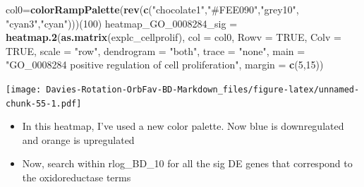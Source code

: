 \documentclass[
]{article}
\newenvironment{Shaded}{\begin{snugshade}}{\end{snugshade}}
\newcommand{\DataTypeTok}[1]{\textcolor[rgb]{0.13,0.29,0.53}{#1}}
\newcommand{\DecValTok}[1]{\textcolor[rgb]{0.00,0.00,0.81}{#1}}
\newcommand{\KeywordTok}[1]{\textcolor[rgb]{0.13,0.29,0.53}{\textbf{#1}}}
\newcommand{\NormalTok}[1]{#1}
\newcommand{\OtherTok}[1]{\textcolor[rgb]{0.56,0.35,0.01}{#1}}
\newcommand{\StringTok}[1]{\textcolor[rgb]{0.31,0.60,0.02}{#1}}
\begin{document}
\begin{Shaded}
\begin{Highlighting}[]
\NormalTok{col0=}\KeywordTok{colorRampPalette}\NormalTok{(}\KeywordTok{rev}\NormalTok{(}\KeywordTok{c}\NormalTok{(}\StringTok{"chocolate1"}\NormalTok{,}\StringTok{"#FEE090"}\NormalTok{,}\StringTok{"grey10"}\NormalTok{, }\StringTok{"cyan3"}\NormalTok{,}\StringTok{"cyan"}\NormalTok{)))(}\DecValTok{100}\NormalTok{)}
\NormalTok{heatmap_GO_}\DecValTok{0008284}\NormalTok{_sig =}\StringTok{ }\KeywordTok{heatmap.2}\NormalTok{(}\KeywordTok{as.matrix}\NormalTok{(explc_cellprolif), }\DataTypeTok{col =}\NormalTok{ col0, }\DataTypeTok{Rowv =} \OtherTok{TRUE}\NormalTok{, }\DataTypeTok{Colv =} \OtherTok{TRUE}\NormalTok{, }\DataTypeTok{scale =} \StringTok{"row"}\NormalTok{,}
                               \DataTypeTok{dendrogram =} \StringTok{"both"}\NormalTok{,}
                               \DataTypeTok{trace =} \StringTok{"none"}\NormalTok{,}
                               \DataTypeTok{main =} \StringTok{"GO_0008284 positive regulation of cell proliferation"}\NormalTok{,}
                               \DataTypeTok{margin =} \KeywordTok{c}\NormalTok{(}\DecValTok{5}\NormalTok{,}\DecValTok{15}\NormalTok{))}
\end{Highlighting}
\end{Shaded}

\texttt{[image: Davies-Rotation-OrbFav-BD-Markdown\_files/figure-latex/unnamed-chunk-55-1.pdf]}

\begin{itemize}
\item
  In this heatmap, I've used a new color palette. Now blue is
  downregulated and orange is upregulated
\item
  Now, search within rlog\_BD\_10 for all the sig DE genes that
  correspond to the oxidoreductase terms
\end{itemize}
\end{document}
